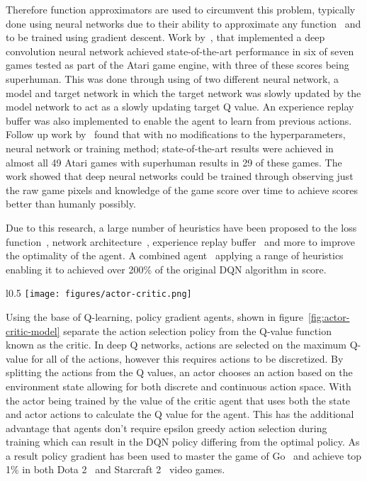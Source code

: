 Therefore function approximators are used to circumvent this problem, typically done using neural networks due to their
ability to approximate any function~\citep{csaji2001approximation} and to be trained using gradient descent.
Work by~\cite{atari}, that implemented a deep convolution neural network achieved state-of-the-art performance in six
of seven games tested as part of the Atari game engine, with three of these scores being superhuman. This was done
through using of two different neural network, a model and target network in which the target network was slowly
updated by the model network to act as a slowly updating target Q value. An experience replay buffer was also
implemented to enable the agent to learn from previous actions.
Follow up work by~\cite{mnih2015humanlevel} found that with no modifications to the hyperparameters, neural network or
training method; state-of-the-art results were achieved in almost all 49 Atari games with superhuman results in 29 of
these games. The work showed that deep neural networks could be trained through observing just the raw game pixels and
knowledge of the game score over time to achieve scores better than humanly possibly.

Due to this research, a large number of heuristics have been proposed to the loss function~\citep{doubledqn},
network architecture~\citep{duelingdqn}, experience replay buffer~\citep{prioritizedexperiencereplay} and more to
improve the optimality of the agent. A combined agent~\citep{rainbow} applying a range of heuristics enabling it to
achieved over 200\% of the original DQN algorithm in score.

\begin{wrapfigure}{l}{0.5\textwidth}
    \centering
    \texttt{[image: figures/actor-critic.png]}
    \caption{Actor Critic model (Source: ~\cite{Sutton1998})}
    \label{fig:actor-critic-model}
\end{wrapfigure}

Using the base of Q-learning, policy gradient agents, shown in figure~\ref{fig:actor-critic-model} separate the action
selection policy from the Q-value function known as the critic. In deep Q networks, actions are selected on the maximum
Q-value for all of the actions, however this requires actions to be discretized. By splitting the actions from the Q
values, an actor chooses an action based on the environment state allowing for both discrete and continuous action space.
With the actor being trained by the value of the critic agent that uses both the state and actor actions to calculate the
Q value for the agent. This has the additional advantage that agents don't require epsilon greedy action selection during
training which can result in the DQN policy differing from the optimal policy. As a result policy gradient has been
used to master the game of Go~\citep{silver2017mastering} and achieve top 1\% in both
Dota 2~\citep{OpenAI_dota} and Starcraft 2~\citep{starcraft2} video games.
